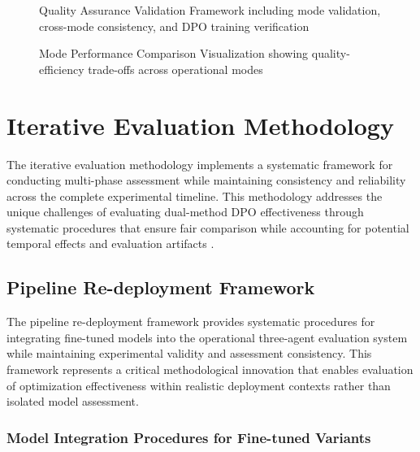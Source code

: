 \begin{figure}[htbp]
    \centering
    \caption{Quality Assurance Validation Framework including mode validation, cross-mode consistency, and DPO training verification}
    \label{fig:quality-assurance-framework}
\end{figure}

\begin{figure}[htbp]
    \centering
    \caption{Mode Performance Comparison Visualization showing quality-efficiency trade-offs across operational modes}
    \label{fig:mode-performance-comparison}
\end{figure}

\section{Iterative Evaluation Methodology}
\label{sec:iterative-evaluation}

The iterative evaluation methodology implements a systematic framework for conducting multi-phase assessment while maintaining consistency and reliability across the complete experimental timeline. This methodology addresses the unique challenges of evaluating dual-method DPO effectiveness through systematic procedures that ensure fair comparison while accounting for potential temporal effects and evaluation artifacts \cite{zhang2024improve_pipeline, xu2024consistency_survey}.

\subsection{Pipeline Re-deployment Framework}

The pipeline re-deployment framework provides systematic procedures for integrating fine-tuned models into the operational three-agent evaluation system while maintaining experimental validity and assessment consistency. This framework represents a critical methodological innovation that enables evaluation of optimization effectiveness within realistic deployment contexts rather than isolated model assessment.

\subsubsection{Model Integration Procedures for Fine-tuned Variants}

